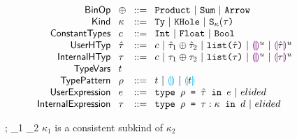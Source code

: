 \documentclass[12pt,letterpaper]{article}
\newcommand{\kconsubkind}[3]{#1 \vdash #2 \lesssim #3}
\newcommand{\kindAna}[3]{#1 \vdash #2 \Leftarrow #3}
\newcommand{\kequiv}[3]{#1 \vdash #2 \equiv #3}
\newcommand{\hPhi}{\Phi}
\newcommand{\hexp}{e}
\newcommand{\dexp}{d}
\newcommand{\htau}{\hat{\tau}}
\newcommand{\hkappa}{\kappa}
\newcommand{\dtau}{\tau}
\newcommand{\hrho}{\rho}
\newcommand{\Ty}{\textt{Ty}}
\newcommand{\KHole}{\textt{KHole}}
\newcommand*{\SKind}[2][\hkappa]{\mathtt{S_{#1}(}#2{\textt{)}}}
\newcommand{\hlist}[1]{\textt{list(}#1\textt{)}}
\newcommand{\llparenthesiscolor}{\textcolor{violet}{\llparenthesis}}
\newcommand{\rrparenthesiscolor}{\textcolor{violet}{\rrparenthesis}}
\newcommand{\llparenthesiscolorc}{\textcolor{cyan}{\llparenthesis}}
\newcommand{\rrparenthesiscolorc}{\textcolor{cyan}{\rrparenthesis}}
\newcommand{\hthole}[1]{\llparenthesiscolor\rrparenthesiscolor^{#1}}
\newcommand{\hhole}[2]{\llparenthesiscolor#1\rrparenthesiscolor^{#2}}
\newcommand{\patehole}{\llparenthesiscolorc\rrparenthesiscolorc}
\newcommand{\pathole}[1]{\llparenthesiscolorc#1\rrparenthesiscolorc}
\newcommand{\htdefine}[3]{\textt{type }#1 \textt{ = } #2\textt{ in }#3}
\newcommand{\dtdefine}[4]{\textt{type }#1 \textt{ = } #2 : #3\textt{ in }#4}
\begin{document}
\begin{figure}[t]
	$\arraycolsep=4pt\begin{array}{rllllll}
			\mathsf{BinOp}               & \oplus & ::= &
			\textt{Product} ~\vert~ \textt{Sum} ~\vert~ \textt{Arrow}                                          \\
			\mathsf{Kind}                & \kappa & ::= &
                        \Ty ~\vert~ \KHole ~\vert~ \SKind{\tau}                                                            \\
			\mathsf{Constant Types}      & c      & ::= &
			\textt{Int} ~\vert~ \textt{Float} ~\vert~ \textt{Bool}                                             \\
			\mathsf{User HTyp}           & \htau  & ::= &
			c ~\vert~ \htau_1 \oplus \htau_2 ~\vert~ \hlist{\htau} ~\vert~ \hthole{u} ~\vert~ \hhole{\htau}{u} \\
			\mathsf{Internal HTyp}       & \dtau  & ::= &
			c ~\vert~ \dtau_1 \oplus \dtau_2 ~\vert~ \hlist{\dtau} ~\vert~ \hthole{u} ~\vert~ \hhole{\dtau}{u} \\
			\mathsf{Type Vars}           & t      &     &                                                      \\
			\mathsf{Type Pattern}        & \hrho  & ::= &
			t ~\vert~ \patehole ~\vert~ \pathole{t}                                                            \\
			\mathsf{User Expression}     & \hexp  & ::= &
			\htdefine{\hrho}{\htau}{\hexp} ~\vert~ elided                                                      \\
			\mathsf{Internal Expression} & \dtau  & ::= &
			\dtdefine{\hrho}{\dtau}{\hkappa}{\dexp} ~\vert~ elided                                             \\
		\end{array}$
\end{figure}

\begin{minipage}{\linewidth}
	\judgbox
	{\kconsubkind{\Delta;\hPhi}{\hkappa_1}{\hkappa_2}}
	{$\hkappa_1$ is a consistent subkind of $\hkappa_2$}
\end{minipage}
\\
\\
\end{document}
